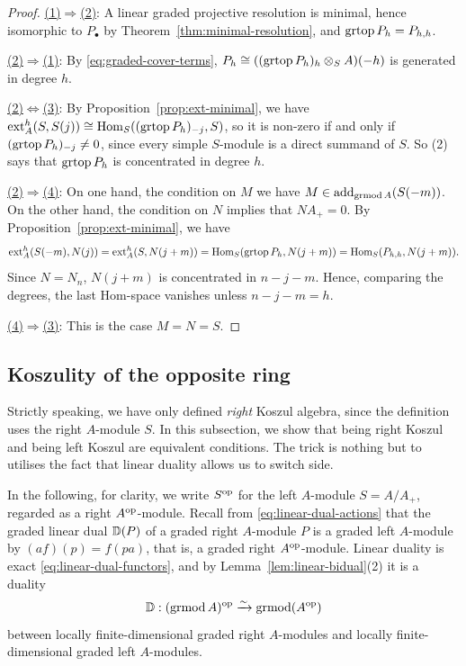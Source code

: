 \begin{proof}
\underline{(1)$\Rightarrow$(2)}:
A linear graded projective resolution is minimal, hence isomorphic to $P_\bullet$ by Theorem~\ref{thm:minimal-resolution}, and $\operatorname{grtop}\nolimits P_h=P_{h,h}$.

\underline{(2)$\Rightarrow$(1)}:
By \eqref{eq:graded-cover-terms}, $P_h\cong((\operatorname{grtop}\nolimits P_h)_h\otimes_SA)(-h)$ is generated in degree $h$.


\underline{(2)$\Leftrightarrow$(3)}: By Proposition~\ref{prop:ext-minimal}, we have $\operatorname{ext}\nolimits_A^h(S,S(j))\cong\operatorname{Hom}\nolimits_S((\operatorname{grtop}\nolimits P_h)_{-j},S)$, so it is non-zero if and only if $(\operatorname{grtop}\nolimits P_h)_{-j}\neq0$, since every simple $S$-module is a direct summand of $S$.
So (2) says that $\operatorname{grtop}\nolimits P_h$ is concentrated in degree $h$.

\underline{(2)$\Rightarrow$(4)}:
On one hand, the condition on $M$ we have $M\in \operatorname{add}_{\operatorname{\mathrm{grmod}} A}(S(-m))$.
On the other hand, the condition on $N$ implies that $NA_+=0$.
By Proposition~\ref{prop:ext-minimal}, we have
\[
\operatorname{ext}\nolimits_A^h(S(-m),N(j))=\operatorname{ext}\nolimits_A^h(S,N(j+m))=\operatorname{Hom}\nolimits_S(\operatorname{grtop}\nolimits P_h, N(j+m))=\operatorname{Hom}\nolimits_S( P_{h,h}, N(j+m)).
\]
Since $N=N_{n}$, $N(j+m)$ is concentrated in $n-j-m$.  Hence, comparing the degrees, the last Hom-space vanishes unless $n-j-m=h$.

\underline{(4)$\Rightarrow$(3)}: This is the case $M=N=S$.
\end{proof}


\subsection{Koszulity of the opposite ring}\label{subsec:opposite}

Strictly speaking, we have only defined \emph{right} Koszul algebra, since the definition uses the right $A$-module $S$.
In this subsection, we show that being right Koszul and being left Koszul are equivalent conditions.
The trick is nothing but to utilises the fact that linear duality allows us to switch side.

In the following, for clarity, we write $S^{\mathrm{op}}$ for the left $A$-module $S=A/A_+$, regarded as a right $A^{\mathrm{op}}$-module.
Recall from \eqref{eq:linear-dual-actions} that the graded linear dual $\mathbb{D}(P)$ of a graded right $A$-module $P$ is a graded left $A$-module by $(af)(p)=f(pa)$, that is, a graded right $A^{\mathrm{op}}$-module.
Linear duality is exact \eqref{eq:linear-dual-functors}, and by Lemma~\ref{lem:linear-bidual}(2) it is a duality
\[
\mathbb{D}:(\operatorname{\mathrm{grmod}} A)^{\mathrm{op}}\xrightarrow{\sim}\operatorname{\mathrm{grmod}}(A^{\mathrm{op}})
\]
between locally finite-dimensional graded right $A$-modules and locally finite-dimensional graded left $A$-modules.


